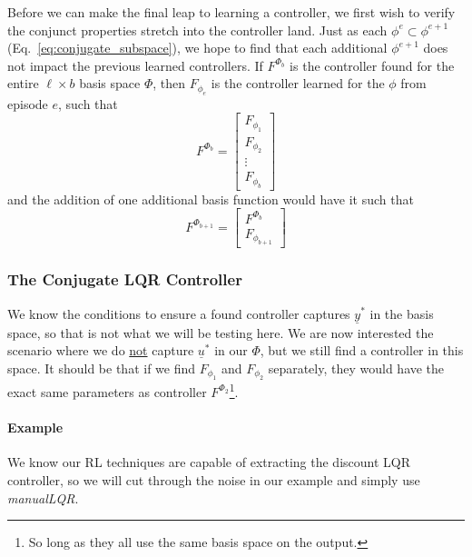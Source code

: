 Before we can make the final leap to learning a controller, we first wish to verify the conjunct properties stretch into the controller land. Just as each $\phi^{e} \subset \phi^{e+1}$ (Eq.~\ref{eq:conjugate_subspace}), we hope to find that each additional $\phi^{e+1}$ does not impact the previous learned controllers. If $F^{\Phi_b}$ is the controller found for the entire $\ell \times b$ basis space $\Phi$, then $F_{\phi_e}$ is the controller learned for the $\phi$ from episode $e$, such that
\begin{equation}
    F^{\Phi_b} = \begin{bmatrix}
        F_{\phi_1} \\ F_{\phi_2} \\ \vdots \\ F_{\phi_b}
    \end{bmatrix}
\end{equation}
and the addition of one additional basis function would have it such that
\begin{equation}
    F^{\Phi_{b+1}} = \begin{bmatrix}
        F^{\Phi_b} \\ F_{\phi_{b+1}}
    \end{bmatrix}
\end{equation}

\FloatBarrier\subsubsection{The Conjugate LQR Controller}
We know the conditions to ensure a found controller captures $\underline{y}^\ast$ in the basis space, so that is not what we will be testing here. We are now interested the scenario where we do \underline{not} capture $\underline{u}^\ast$ in our $\Phi$, but we still find a controller in this space. It should be that if we find $F_{\phi_1}$ and $F_{\phi_2}$ separately, they would have the exact same parameters as controller $F^{\Phi_2}$\footnote{So long as they all use the same basis space on the output.}.

\FloatBarrier\paragraph{Example }
We know our RL techniques are capable of extracting the discount LQR controller, so we will cut through the noise in our example and simply use \textit{manualLQR}. 

